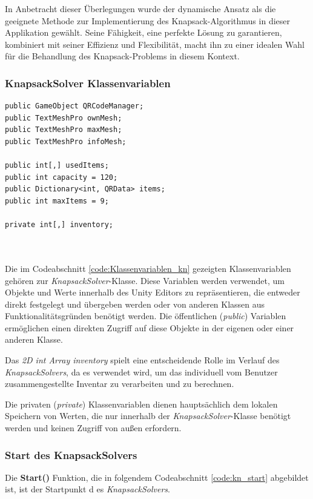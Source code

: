 In Anbetracht dieser Überlegungen wurde der dynamische Ansatz als die geeignete Methode zur Implementierung des Knapsack-Algorithmus
in dieser Applikation gewählt. Seine Fähigkeit, eine perfekte Lösung zu garantieren, kombiniert mit seiner Effizienz und
Flexibilität, macht ihn zu einer idealen Wahl für die Behandlung des Knapsack-Problems in diesem Kontext.

\subsubsection{KnapsackSolver Klassenvariablen}
\begin{lstlisting}[style=csharp, caption={Klassenvariablen des KnapsackSolvers}, label=code:Klassenvariablen_kn]
public GameObject QRCodeManager;
public TextMeshPro ownMesh;
public TextMeshPro maxMesh;
public TextMeshPro infoMesh;

public int[,] usedItems;
public int capacity = 120;
public Dictionary<int, QRData> items;
public int maxItems = 9;

private int[,] inventory;
\end{lstlisting}\\
\\
Die im Codeabschnitt \ref{code:Klassenvariablen_kn} gezeigten Klassenvariablen gehören zur \textit{KnapsackSolver}-Klasse.
Diese Variablen werden verwendet, um Objekte und Werte innerhalb des Unity Editors zu repräsentieren, die entweder direkt
festgelegt und übergeben werden oder von anderen Klassen aus Funktionalitätsgründen benötigt werden. Die öffentlichen
(\textit{public}) Variablen ermöglichen einen direkten Zugriff auf diese Objekte in der eigenen oder einer anderen Klasse.

Das \textit{2D int Array inventory} spielt eine entscheidende Rolle im Verlauf des \textit{KnapsackSolvers}, da es verwendet
wird, um das individuell vom Benutzer zusammengestellte Inventar zu verarbeiten und zu berechnen.

Die privaten (\textit{private}) Klassenvariablen dienen hauptsächlich dem lokalen Speichern von Werten, die nur innerhalb
der \textit{KnapsackSolver}-Klasse benötigt werden und keinen Zugriff von außen erfordern.

\subsubsection{Start des KnapsackSolvers}
Die \textbf{Start()} Funktion, die in folgendem Codeabschnitt \ref{code:kn_start} abgebildet ist, ist der Startpunkt d
es \textit{KnapsackSolvers}.

